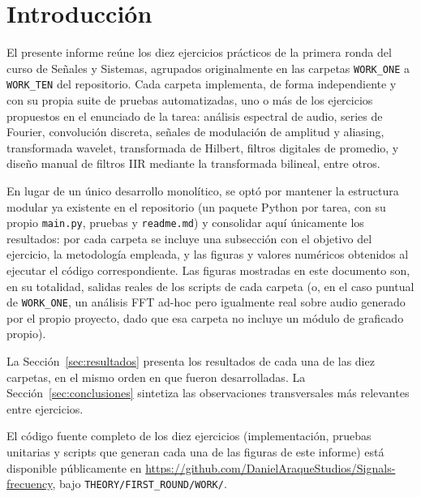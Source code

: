 
\section{Introducción}

El presente informe reúne los diez ejercicios prácticos de la primera
ronda del curso de Señales y Sistemas, agrupados originalmente en las
carpetas \texttt{WORK\_ONE} a \texttt{WORK\_TEN} del repositorio. Cada
carpeta implementa, de forma independiente y con su propia suite de
pruebas automatizadas, uno o más de los ejercicios propuestos en el
enunciado de la tarea: análisis espectral de audio, series de Fourier,
convolución discreta, señales de modulación de amplitud y aliasing,
transformada wavelet, transformada de Hilbert, filtros digitales de
promedio, y diseño manual de filtros IIR mediante la transformada
bilineal, entre otros.

En lugar de un único desarrollo monolítico, se optó por mantener la
estructura modular ya existente en el repositorio (un paquete Python por
tarea, con su propio \texttt{main.py}, pruebas y \texttt{readme.md}) y
consolidar aquí únicamente los resultados: por cada carpeta se incluye
una subsección con el objetivo del ejercicio, la metodología empleada, y
las figuras y valores numéricos obtenidos al ejecutar el código
correspondiente. Las figuras mostradas en este documento son, en su
totalidad, salidas reales de los scripts de cada carpeta (o, en el caso
puntual de \texttt{WORK\_ONE}, un análisis FFT ad-hoc pero igualmente
real sobre audio generado por el propio proyecto, dado que esa carpeta no
incluye un módulo de graficado propio).

La Sección~\ref{sec:resultados} presenta los resultados de cada una de
las diez carpetas, en el mismo orden en que fueron desarrolladas. La
Sección~\ref{sec:conclusiones} sintetiza las observaciones transversales
más relevantes entre ejercicios.

El código fuente completo de los diez ejercicios (implementación, pruebas
unitarias y scripts que generan cada una de las figuras de este informe)
está disponible públicamente en
\url{https://github.com/DanielAraqueStudios/Signals-frecuency}, bajo
\texttt{THEORY/FIRST\_ROUND/WORK/}.
